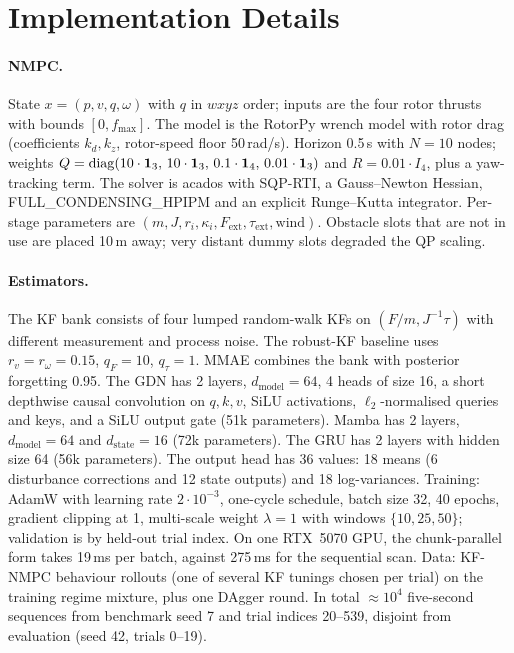 \section{Implementation Details}
\label{app:impl}

\paragraph{NMPC.}
State $x=(p,v,q,\omega)$ with $q$ in $wxyz$ order; inputs are the four rotor thrusts with bounds $[0,f_{\max}]$. The model is the RotorPy wrench model with rotor drag (coefficients $k_d,k_z$, rotor-speed floor 50\,rad/s).
Horizon 0.5\,s with $N{=}10$ nodes; weights $Q=\mathrm{diag}(10\cdot\mathbf{1}_3,\,10\cdot\mathbf{1}_3,\,0.1\cdot\mathbf{1}_4,\,0.01\cdot\mathbf{1}_3)$ and $R=0.01\cdot I_4$, plus a yaw-tracking term.
The solver is acados with SQP-RTI, a Gauss--Newton Hessian, FULL\_CONDENSING\_HPIPM and an explicit Runge--Kutta integrator. Per-stage parameters are $(m,J,r_i,\kappa_i,F_{\mathrm{ext}},\tau_{\mathrm{ext}},\text{wind})$.
Obstacle slots that are not in use are placed 10\,m away; very distant dummy slots degraded the QP scaling.

\paragraph{Estimators.}
The KF bank consists of four lumped random-walk KFs on $(F/m,J^{-1}\tau)$ with different measurement and process noise. The robust-KF baseline uses $r_v{=}r_\omega{=}0.15$, $q_F{=}10$, $q_\tau{=}1$. MMAE combines the bank with posterior forgetting 0.95.
The GDN has 2 layers, $d_{\mathrm{model}}{=}64$, 4 heads of size 16, a short depthwise causal convolution on $q,k,v$, SiLU activations, $\ell_2$-normalised queries and keys, and a SiLU output gate (51k parameters). Mamba has 2 layers, $d_{\mathrm{model}}{=}64$ and $d_{\mathrm{state}}{=}16$ (72k parameters). The GRU has 2 layers with hidden size 64 (56k parameters).
The output head has 36 values: 18 means (6 disturbance corrections and 12 state outputs) and 18 log-variances.
Training: AdamW with learning rate $2\cdot10^{-3}$, one-cycle schedule, batch size 32, 40 epochs, gradient clipping at 1, multi-scale weight $\lambda{=}1$ with windows $\{10,25,50\}$; validation is by held-out trial index. On one RTX~5070 GPU, the chunk-parallel form takes 19\,ms per batch, against 275\,ms for the sequential scan.
Data: KF-NMPC behaviour rollouts (one of several KF tunings chosen per trial) on the training regime mixture, plus one DAgger round. In total ${\approx}10^4$ five-second sequences from benchmark seed 7 and trial indices 20--539, disjoint from evaluation (seed 42, trials 0--19).

